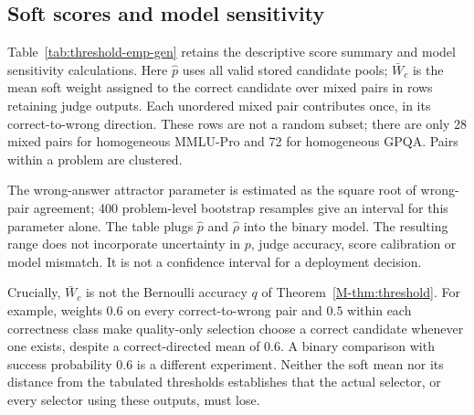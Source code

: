 \subsection{Soft scores and model sensitivity}
\label{sec:score-diagnostics}

Table~\ref{tab:threshold-emp-gen} retains the descriptive score summary
and model sensitivity calculations. Here $\hat p$ uses all valid stored
candidate pools; $\bar W_c$ is the mean soft weight assigned to the correct
candidate over mixed pairs in rows retaining judge outputs. Each unordered
mixed pair contributes once, in its correct-to-wrong direction. These
rows are not a random subset; there are only 28 mixed pairs for homogeneous
MMLU-Pro and 72 for homogeneous GPQA. Pairs within a problem are clustered.

The wrong-answer attractor parameter is estimated as the square root of
wrong-pair agreement; 400 problem-level bootstrap resamples give an
interval for this parameter alone. The table plugs $\hat p$ and
$\hat\rho$ into the binary model. The resulting range does not incorporate
uncertainty in $p$, judge accuracy, score calibration or model mismatch.
It is not a confidence interval for a deployment decision.

Crucially, $\bar W_c$ is not the Bernoulli accuracy $q$ of
Theorem~\ref{M-thm:threshold}. For example, weights $0.6$ on every
correct-to-wrong pair and $0.5$ within each correctness class make
quality-only selection choose a correct candidate whenever one exists,
despite a correct-directed mean of $0.6$. A binary comparison with
success probability $0.6$ is a different experiment. Neither the soft
mean nor its distance from the tabulated thresholds establishes that
the actual selector, or every selector using these outputs, must lose.

\begin{table}[htbp]
\centering
\caption{Descriptive soft scores and binary-model sensitivity, not an
empirical threshold test. $\bar W_c$: correct-directed mixed-pair weight;
$\hat\rho$: square root of wrong-pair agreement, with 95\% bootstrap
interval. $q^*_0$ and $q^*_{\hat\rho}$ are binary-model thresholds; the
bracketed range propagates only the $\rho$ interval. $^\ddagger$: fewer
than 30 wrong pairs, so the full $\rho\in[0,1]$ range is used. H denotes
heterogeneous generation.}
\label{tab:threshold-emp-gen}
\small
{}
\end{table}

